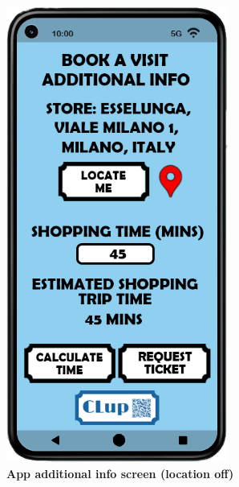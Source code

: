 \begin{itemize}
\begin{figure}[!htb]
\begin{minipage}{0.4\textwidth}
\includegraphics[width=0.65\textwidth]{Images/App/Android_AdditionalInfoNoLoc}
\captionsetup{justification=centering}
\caption{\label{fig:androidinfonoloc}\textbf {App additional info screen (location off)}}
\end{minipage}
\end{figure}


\end{itemize}
